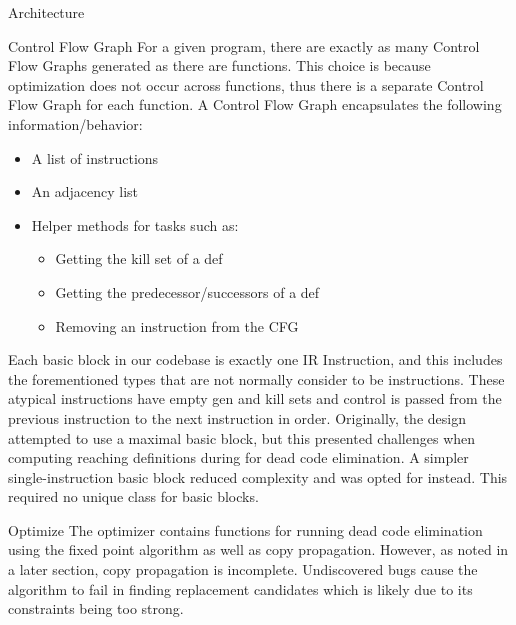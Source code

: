 \documentclass[letterpaper,12pt]{article}
\theoremstyle{definition}
\begin{document}
\begin{section}{Architecture}
		\begin{subsection}{Control Flow Graph}
			For a given program, there are exactly as many Control Flow Graphs generated as there are functions. This choice is because optimization does not occur across functions, thus there is a separate Control Flow Graph for each function. A Control Flow Graph encapsulates the following information/behavior:
			\begin{itemize}
				\item A list of instructions
				\item An adjacency list
				\item Helper methods for tasks such as:
					\begin{itemize}
						\item Getting the kill set of a def
						\item Getting the predecessor/successors of a def
						\item Removing an instruction from the CFG
					\end{itemize}
			\end{itemize}
			Each basic block in our codebase is exactly one IR Instruction, and this includes the forementioned  types that are not normally consider to be instructions. These atypical instructions have empty gen and kill sets and control is passed  from the previous instruction to the next instruction in order. Originally, the design attempted to use a maximal basic block, but this presented challenges when computing reaching definitions during for dead code elimination. A simpler single-instruction basic block reduced complexity and was opted for instead. This required no unique class for basic blocks.
		\end{subsection}

		\begin{subsection}{Optimize}
			The optimizer contains functions for running dead code elimination using the fixed point algorithm as well as copy propagation. However, as noted in a later section, copy propagation is incomplete. Undiscovered bugs cause the algorithm to fail in finding replacement candidates which is likely due to its constraints being too strong.


\end{subsection}
\end{section}
\end{document}

